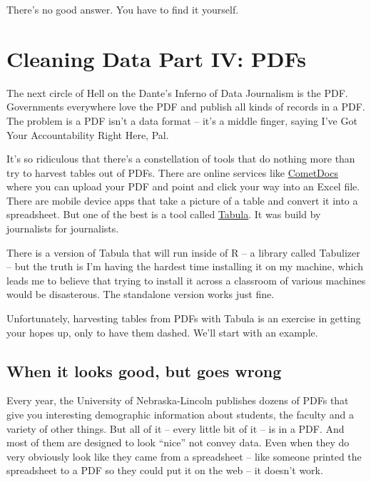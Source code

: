 \documentclass[]{book}
\begin{document}
There's no good answer. You have to find it yourself.

\hypertarget{cleaning-data-part-iv-pdfs}{%
\chapter{Cleaning Data Part IV: PDFs}\label{cleaning-data-part-iv-pdfs}}

The next circle of Hell on the Dante's Inferno of Data Journalism is the PDF. Governments everywhere love the PDF and publish all kinds of records in a PDF. The problem is a PDF isn't a data format -- it's a middle finger, saying I've Got Your Accountability Right Here, Pal.

It's so ridiculous that there's a constellation of tools that do nothing more than try to harvest tables out of PDFs. There are online services like \href{https://www.cometdocs.com/}{CometDocs} where you can upload your PDF and point and click your way into an Excel file. There are mobile device apps that take a picture of a table and convert it into a spreadsheet. But one of the best is a tool called \href{https://tabula.technology/}{Tabula}. It was build by journalists for journalists.

There is a version of Tabula that will run inside of R -- a library called Tabulizer -- but the truth is I'm having the hardest time installing it on my machine, which leads me to believe that trying to install it across a classroom of various machines would be disasterous. The standalone version works just fine.

Unfortunately, harvesting tables from PDFs with Tabula is an exercise in getting your hopes up, only to have them dashed. We'll start with an example.

\hypertarget{when-it-looks-good-but-goes-wrong}{%
\section{When it looks good, but goes wrong}\label{when-it-looks-good-but-goes-wrong}}

Every year, the University of Nebraska-Lincoln publishes dozens of PDFs that give you interesting demographic information about students, the faculty and a variety of other things. But all of it -- every little bit of it -- is in a PDF. And most of them are designed to look ``nice'' not convey data. Even when they do very obviously look like they came from a spreadsheet -- like someone printed the spreadsheet to a PDF so they could put it on the web -- it doesn't work.
\end{document}
